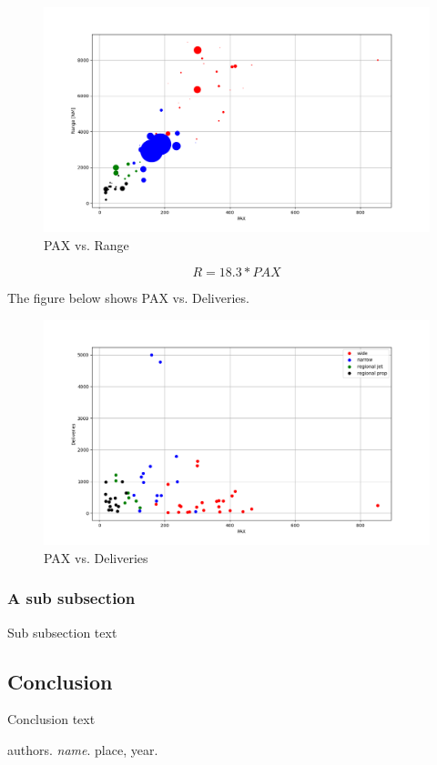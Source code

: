 \documentclass[12pt]{article} %
\begin{document}
\begin{figure}[h]
\begin{center}
\includegraphics[width=1\textwidth]{pax_v_range}
\end{center}
\caption{PAX vs. Range}
\end{figure}

\begin{equation} \label{eq:1}
R = 18.3*PAX
\end{equation}

The figure below shows PAX vs. Deliveries.

\begin{figure}[h]
\begin{center}
\includegraphics[width=1\textwidth]{pax_v_deliveries}
\end{center}
\caption{PAX vs. Deliveries}
\end{figure}

\subsubsection{A sub subsection}

Sub subsection text

\subsection{Conclusion}

Conclusion text

\pagebreak

\begin{thebibliography}{9}
authors. 
\textit{name}. 
place, year.
\end{thebibliography}
\end{document}
